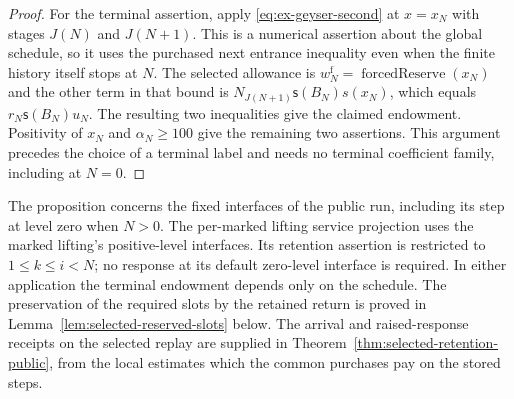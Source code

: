 \begin{proof}
For the terminal assertion, apply
\eqref{eq:ex-geyser-second} at $x=x_N$ with stages $J(N)$ and $J(N+1)$.
This is a numerical assertion about the global schedule, so it uses
the purchased next entrance inequality even when the finite history
itself stops at $N$. The selected allowance is
$w_N^{\mathrm f}=\operatorname{forcedReserve}(x_N)$ and the other term in that
bound is $N_{J(N+1)}\mathsf s(B_N)s(x_N)$, which equals
$r_N\mathsf s(B_N)u_N$. The resulting two inequalities give the claimed
endowment. Positivity of $x_N$ and $\alpha_N\ge100$ give the remaining
two assertions. This argument precedes the choice of a terminal
label and needs no terminal coefficient family, including at $N=0$.
\end{proof}

The proposition concerns the fixed interfaces of the public run, including
its step at level zero when $N>0$. The per-marked lifting service projection
uses the marked lifting's positive-level interfaces. Its retention assertion
is restricted to $1\le k\le i<N$; no response at its default zero-level
interface is required. In either application the terminal endowment depends
only on the schedule. The preservation of the required slots by the
retained return is proved in Lemma~\ref{lem:selected-reserved-slots}
below. The arrival and raised-response receipts on the selected
replay are supplied in Theorem~\ref{thm:selected-retention-public},
from the local estimates which the common purchases pay on the stored
steps.


